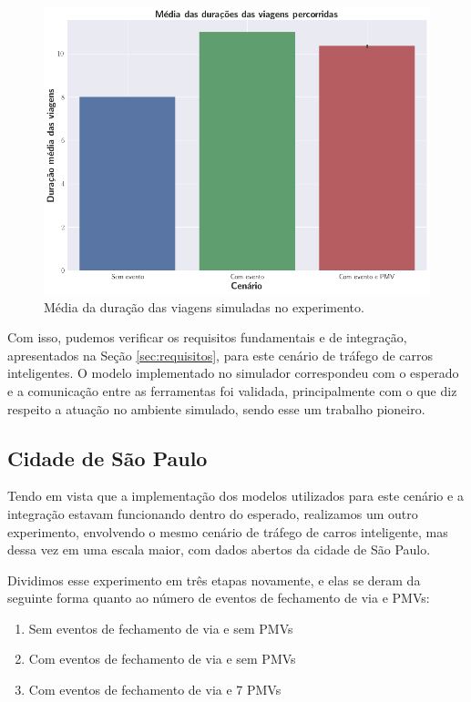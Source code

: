 \begin{figure}[ht]
	\centering
	\includegraphics[width=.8\textwidth]{figuras/duracao_validacao.png}
	\caption{Média da duração das viagens simuladas no experimento.}
	\label{fig:duracao_validacao}
\end{figure}

Com isso, pudemos verificar os requisitos fundamentais e de integração, apresentados na Seção \ref{sec:requisitos}, para este cenário de tráfego de carros inteligentes.
O modelo implementado no simulador correspondeu com o esperado e a comunicação entre as ferramentas foi validada, principalmente com o que diz respeito a atuação no ambiente simulado, sendo esse um
trabalho pioneiro.

\subsection{Cidade de São Paulo}
\label{sec:smart_traffic}

Tendo em vista que a implementação dos modelos utilizados para este cenário e a integração estavam funcionando dentro do esperado, realizamos um outro experimento, envolvendo o mesmo cenário de tráfego de
carros inteligente, mas dessa vez em uma escala maior, com dados abertos da cidade de São Paulo.

Dividimos esse experimento em três etapas novamente, e elas se deram da seguinte forma quanto ao número de eventos de fechamento de via e PMVs:

\begin{enumerate}
    \item Sem eventos de fechamento de via e sem PMVs

    \item Com eventos de fechamento de via e sem PMVs

    \item Com eventos de fechamento de via e 7 PMVs
\end{enumerate}

